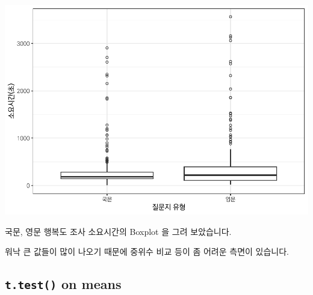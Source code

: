 \documentclass[
]{book}
\begin{document}
\includegraphics{Quiz_report_2025_files/figure-latex/unnamed-chunk-243-1.pdf}

국문, 영문 행복도 조사 소요시간의 Boxplot 을 그려 보았습니다.

워낙 큰 값들이 많이 나오기 때문에 중위수 비교 등이 좀 어려운 측면이 있습니다.

\subsection{\texorpdfstring{\texttt{t.test()} on means}{t.test() on means}}\label{t.test-on-means-1}
\end{document}
